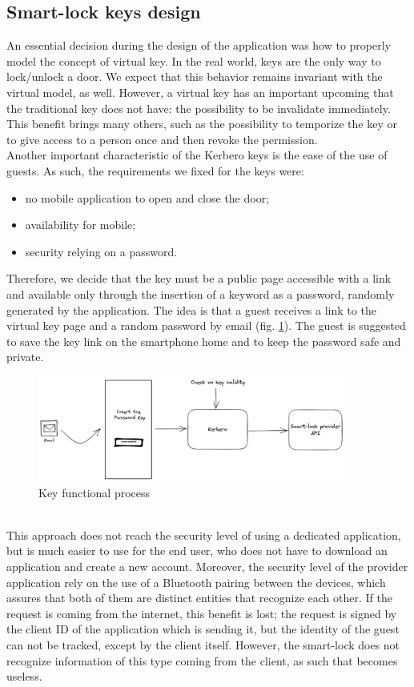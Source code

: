 \subsection{Smart-lock keys design}
An essential decision during the design of the application was how to properly model the concept of virtual key. In the real world, keys are the only way to lock/unlock a door. We expect that this behavior remains invariant with the virtual model, as well. However, a virtual key has an important upcoming that the traditional key does not have: the possibility to be invalidate immediately. This benefit brings many others, such as the possibility to temporize the key or to give access to a person once and then revoke the permission. 
\\ Another important characteristic of the Kerbero keys is the ease of the use of guests. As such, the requirements we fixed for the keys were:
\begin{itemize}
    \item no mobile application to open and close the door;
    \item availability for mobile;
    \item security relying on a password.
\end{itemize}
Therefore, we decide that the key must be a public page accessible with a link and available only through the insertion of a keyword as a password, randomly generated by the application. The idea is that a guest receives a link to the virtual key page and a random password by email (fig. \ref{fig:keyfeat}). The guest is suggested to save the key link on the smartphone home and to keep the password safe and private.
\begin{figure}[ht]
    \centering
    \includegraphics[width=0.9\textwidth]{figures/keyfeat.excalidraw.png}
    \caption{Key functional process}
    \label{fig:keyfeat}
\end{figure}
\\ This approach does not reach the security level of using a dedicated application, but is much easier to use for the end user, who does not have to download an application and create a new account. Moreover, the security level of the provider application rely on the use of a Bluetooth pairing between the devices, which assures that both of them are distinct entities that recognize each other. If the request is coming from the internet, this benefit is lost; the request is signed by the client ID of the application which is sending it, but the identity of the guest can not be tracked, except by the client itself. However, the smart-lock does not recognize information of this type coming from the client, as such that becomes useless. 
